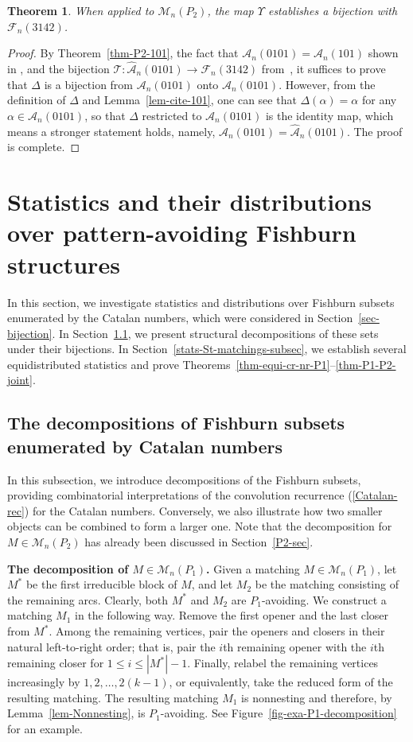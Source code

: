 \documentclass[11pt]{article}
\newtheorem{thm}{Theorem}[section]
\newcommand{\A}{\mathcal{A}}
\newcommand{\F}{\mathcal{F}}
\newcommand{\M}{\mathcal{M}}
\newcommand{\T}{\mathcal{T}}
\begin{document}
	\begin{thm}\label{thm-MnP2-Fn3142}
		When applied to $\M_n(P_2)$, the map $\Upsilon$ establishes a bijection with $\F_n(3142)$.
	\end{thm}
	\begin{proof}
		By Theorem~\ref{thm-P2-101}, the fact that $\A_n(0101)=\A_n(101)$ shown in \cite[Theorem 2.5]{Duncan-Steingrimsson}, 
		and the bijection $\T\colon \hat{\A}_n(0101) \to \F_n(3142)$ from~\cite[Table 2]{Cerbai-Claesson}, 
		it suffices to prove that $\Delta$ is a bijection from $\A_n(0101)$ onto $\hat{\A}_n(0101)$. 
		However, from the definition of $\Delta$ and Lemma~\ref{lem-cite-101}, 
		one can see that $\Delta(\alpha)=\alpha$ for any $\alpha \in \A_n(0101)$, 
		so that $\Delta$ restricted to $\A_n(0101)$ is the identity map, which means  a stronger statement holds, namely, $\A_n(0101) = \hat{\A}_n(0101)$.
		The proof is complete.
	\end{proof}
	
	\section{Statistics and their distributions over pattern-avoiding Fishburn structures}\label{sec-stats}
	In this section, we investigate statistics and distributions over Fishburn subsets enumerated by the Catalan numbers, which were considered in Section~\ref{sec-bijection}.
	In Section~\ref{subsec-decomp}, we present structural decompositions of these sets under their bijections.
	In Section~\ref{stats-St-matchings-subsec}, we establish  several equidistributed statistics and prove Theorems~\ref{thm-equi-cr-nr-P1}--\ref{thm-P1-P2-joint}.
	
	\subsection{The decompositions of Fishburn subsets enumerated by  Catalan numbers}\label{subsec-decomp}
	In this subsection, we introduce decompositions of the Fishburn subsets, providing combinatorial interpretations of the convolution recurrence (\ref{Catalan-rec}) for the Catalan numbers.  Conversely, we also illustrate how two smaller objects can be combined to form a larger one. Note that the decomposition for $M \in \mathcal{M}_n(P_2)$ has already been discussed in Section~\ref{P2-sec}.
	
	\textbf{The decomposition of $ M \in \mathcal{M}_n(P_1)$.} 
	Given a matching $M \in \mathcal{M}_n(P_1)$, let $M^*$ be the first irreducible block of $M$, and let $M_2$ be the matching consisting of the remaining arcs. Clearly, both $M^*$ and $M_2$ are $P_1$-avoiding.
	We construct a matching $M_1$ in the following way. Remove the first opener and the last closer from $M^*$. Among the remaining vertices, pair the openers and closers in their natural left-to-right order; that is, pair the $i$th remaining opener with the $i$th remaining closer for $1\le i\le |M^*|-1$.
	Finally, relabel the remaining vertices increasingly by \(1,2,\ldots,2(k-1)\), or equivalently, take the reduced form of the resulting matching.
	The resulting matching $M_1$ is nonnesting and therefore, by Lemma~\ref{lem-Nonnesting}, is $P_1$-avoiding.
	See Figure~\ref{fig-exa-P1-decomposition} for an example.
	
\end{document}
